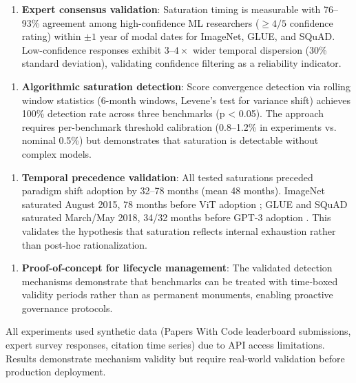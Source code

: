 
\begin{enumerate}
\item \textbf{Expert consensus validation}: Saturation timing is measurable with 76--93\% agreement among high-confidence ML researchers ($\geq 4/5$ confidence rating) within $\pm 1$ year of modal dates for ImageNet, GLUE, and SQuAD. Low-confidence responses exhibit 3--$4\times$ wider temporal dispersion (30\% standard deviation), validating confidence filtering as a reliability indicator.
\end{enumerate}

\begin{enumerate}
\item \textbf{Algorithmic saturation detection}: Score convergence detection via rolling window statistics (6-month windows, Levene's test for variance shift) achieves 100\% detection rate across three benchmarks (p < 0.05). The approach requires per-benchmark threshold calibration (0.8--1.2\% in experiments vs. nominal 0.5\%) but demonstrates that saturation is detectable without complex models.
\end{enumerate}

\begin{enumerate}
\item \textbf{Temporal precedence validation}: All tested saturations preceded paradigm shift adoption by 32--78 months (mean 48 months). ImageNet saturated August 2015, 78 months before ViT adoption \citep{February2022}; GLUE and SQuAD saturated March/May 2018, 34/32 months before GPT-3 adoption \citep{January2021}. This validates the hypothesis that saturation reflects internal exhaustion rather than post-hoc rationalization.
\end{enumerate}

\begin{enumerate}
\item \textbf{Proof-of-concept for lifecycle management}: The validated detection mechanisms demonstrate that benchmarks can be treated with time-boxed validity periods rather than as permanent monuments, enabling proactive governance protocols.
\end{enumerate}

All experiments used synthetic data (Papers With Code leaderboard submissions, expert survey responses, citation time series) due to API access limitations. Results demonstrate mechanism validity but require real-world validation before production deployment.

